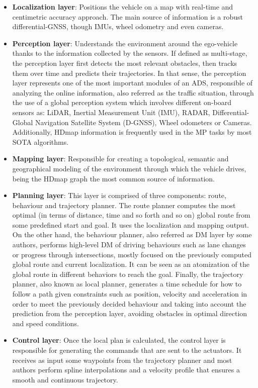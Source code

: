 \begin{itemize}
	
	\item \textbf{Localization layer}: Positions the vehicle on a map with real-time and centimetric accuracy approach. The main source of information is a robust differential-GNSS, though IMUs, wheel odometry and even cameras.
	
	\item \textbf{Perception layer}: Understands the environment around the ego-vehicle thanks to the information collected by the sensors. If defined as multi-stage, the perception layer first detects the most relevant obstacles, then tracks them over time and predicts their trajectories. In that sense, the perception layer represents one of the most important modules of an \ac{ADS}, responsible of analyzing the online information, also referred as the traffic situation, through the use of a global perception system which involves different on-board sensors as: \ac{LiDAR}, Inertial Measurement Unit (IMU), \ac{RADAR}, Differential-Global Navigation Satellite System (D-GNSS), Wheel odometers or Cameras. Additionally, \ac{HDmap} information is frequently used in the \ac{MP} tasks by most \ac{SOTA} algorithms.

	\item \textbf{Mapping layer}: Responsible for creating a topological, semantic and geographical modeling of the environment through which the vehicle drives, being the \ac{HDmap} graph the most common source of information.
	
	\item \textbf{Planning layer}: This layer is comprised of three components: route, behaviour and trajectory planner. The route planner computes the most optimal (in terms of distance, time and so forth and so on) global route from some predefined start and goal. It uses the localization and mapping output. On the other hand, the behaviour planner, also referred as \ac{DM} layer by some authors, performs high-level \ac{DM} of driving behaviours such as lane changes or progress through intersections, mostly focused on the previously computed global route and current localization. It can be seen as an atomization of the global route in different behaviors to reach the goal. Finally, the trajectory planner, also known as local planner, generates a time schedule for how to follow a path given constraints such as position, velocity and acceleration in order to meet the previously decided behaviour and taking into account the prediction from the perception layer, avoiding obstacles in optimal direction and speed conditions.
	
	\item \textbf{Control layer}: Once the local plan is calculated, the control layer is responsible for generating the commands that are sent to the actuators. It receives as input some waypoints from the trajectory planner and most authors perform spline interpolations and a velocity profile that ensures a smooth and continuous trajectory. 
	
\end{itemize}

